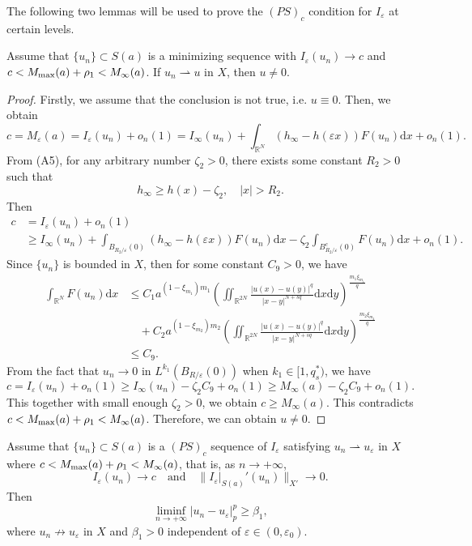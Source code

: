 \documentclass[reqno]{amsart}
\begin{document}
The following two lemmas will be used to prove the $(PS)_c$ condition for 
$I_\varepsilon$ at certain levels.

\begin{lemma}\label{lem:3.2}
Assume that $\{u_n\}\subset S(a)$ is a minimizing sequence with 
$I_\varepsilon(u_n)\to c$ and $c < M_{\rm max}(a)+\rho_1 < M_{\infty}(a)$.
If $u_n\rightharpoonup u$ in $X$, then $u \neq  0$.
\end{lemma}

\begin{proof}
Firstly, we assume that the conclusion is not true, i.e. $u\equiv0$. 
Then, we obtain
$$
c=M_{\varepsilon}(a)=I_\varepsilon(u_n)+o_n(1)
=I_\infty(u_n)+\int_{\mathbb{R}^N}(h_\infty-h(\varepsilon x))F(u_n)\mathrm{d}x+o_n(1).
$$
From (A5), for any arbitrary number $\zeta_2>0$, there exists some constant $ R_2 > 0$ 
such that
$$
h_{\infty}\ge h(x)-\zeta_2,\quad|x|>R_2.
$$
Then
\begin{align*}
c&= I_\varepsilon(u_n)+o_n(1)\\
&\geq  I_\infty(u_n)+\int_{B_{R_2/\varepsilon}(0)}(h_\infty-
h(\varepsilon x))F(u_n)\mathrm{d}x-\zeta_2\int_{B_{R_2/\varepsilon}^{c}(0)}F(u_n)
\mathrm{d}x+o_n(1).
\end{align*}
Since $\{u_n\}$ is bounded in $X$, then for some constant $C_9 > 0$, we have
\begin{align*}
\int_{\mathbb{R}^N}F(u_n)\mathrm{d}x
&\le C_1a^{(1-\xi_{m_1})m_1}(\iint_{\mathbb{R}^{2N}}
 \frac{|u(x)-u(y)|^{q}}{|x-y|^{N+sq}}\mathrm{d}x\mathrm{d}y)^{\frac{m_1\xi_{m_1}}{q}}\\
&\quad +C_2a^{(1-\xi_{m_2})m_2}(\iint_{\mathbb{R}^{2N}}
 \frac{|u(x)-u(y)|^{q}}{|x-y|^{N+sq}}\mathrm{d}x\mathrm{d}y)^{\frac{m_2\xi_{m_2}}{q}}\\
&\le C_9.
\end{align*}
From the fact that $u_n\to 0$ in $L^{k_1}(B_{R/\varepsilon}(0))$ when 
$k_1\in[1,q_{s}^{*})$, we have
$$
c=I_\varepsilon(u_n)+o_n(1)\ge I_\infty(u_n)-\zeta_2 C_9+o_n(1)\ge M_\infty (a)
-\zeta_2 C_9+o_n(1).
$$
This together with small enough $\zeta_2> 0$, we obtain
$c\ge M_\infty (a)$.
This contradicts $c < M_{\rm max}(a) + \rho_1 < M_\infty(a)$. 
Therefore, we can obtain $u\neq 0$.
\end{proof}

\begin{lemma}\label{lem:3.3} 
Assume that $\{u_n\}\subset S(a)$  is a
$(PS)_c$ sequence of $I_\varepsilon$ satisfying $u_n\rightharpoonup u_\varepsilon$ 
in $X$ where $c < M_{\rm max}(a) + \rho_1 <M_{\infty}(a)$, that is, as $n\to+\infty$,
$$
I_\varepsilon(u_n)\to c \quad \text{and}\quad\|I_\varepsilon|_{S(a)}'(u_n)\|_{X'}\to 0.
$$
Then
$$
\liminf_{n\to+\infty}|u_n-u_\varepsilon|_p^{p}\ge \beta_1,
$$
where $u_n\not\to u_\varepsilon $ in $X$ and $\beta_1>0$ independent of 
$\varepsilon\in(0,\varepsilon_0)$.
\end{lemma}
\end{document}
